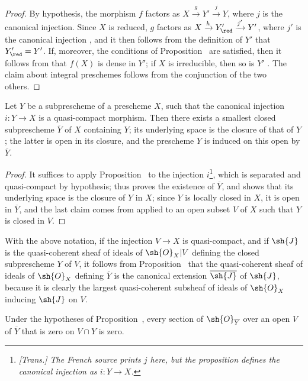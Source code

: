 \begin{proof}
By hypothesis, the morphism $f$ factors as $X\xrightarrow{g}Y'\xrightarrow{j}Y$, where $j$ is the canonical injection.
Since $X$ is reduced, $g$ factors as $X\xrightarrow{h}Y'_\red\xrightarrow{j'}Y'$, where $j'$ is the canonical injection , and it then follows from the definition of $Y'$ that $Y'_\red=Y'$.
If, moreover, the conditions of Proposition~ are satisfied, then it follows from  that $f(X)$ is dense in $Y'$; if $X$ is irreducible, then so is $Y'$ .
The claim about integral preschemes follows from the conjunction of the two others.
\end{proof}

\begin{proposition}[9.5.10]
\label{I.9.5.10}
Let $Y$ be a subprescheme of a prescheme $X$, such that the canonical injection $i:Y\to X$ is a quasi-compact morphism.
Then there exists a smallest closed subprescheme $\overline{Y}$ of $X$ containing $Y$; its underlying space is the closure of that of $Y$; the latter is open in its closure, and the prescheme $Y$ is induced on this open by $\overline{Y}$.
\end{proposition}

\begin{proof}
It suffices to apply Proposition~ to the injection $i$\footnote{\emph{[Trans.] The French source prints $j$ here, but the proposition defines the canonical injection as $i:Y\to X$.}}, which is separated  and quasi-compact by hypothesis;  thus proves the existence of $\overline{Y}$, and  shows that its underlying space is the closure of $Y$ in $X$; since $Y$ is locally closed in $X$, it is open in $\overline{Y}$, and the last claim comes from  applied to an open subset $V$ of $X$ such that $Y$ is closed in $V$.
\end{proof}

With the above notation, if the injection $V\to X$ is quasi-compact, and if $\sh{J}$ is the quasi-coherent sheaf of ideals of $\sh{O}_X|V$ defining the closed subprescheme $Y$ of $V$, it follows from Proposition~ that the quasi-coherent sheaf of ideals of $\sh{O}_X$ defining $\overline{Y}$ is the canonical extension  $\overline{\sh{J}}$ of $\sh{J}$, because it is clearly the largest quasi-coherent subsheaf of ideals of $\sh{O}_X$ inducing $\sh{J}$ on $V$.

\begin{corollary}[9.5.11]
\label{I.9.5.11}
Under the hypotheses of Proposition~, every section of $\sh{O}_{\overline{Y}}$ over an open $V$ of $\overline{Y}$ that is zero on $V\cap Y$ is zero.
\end{corollary}

